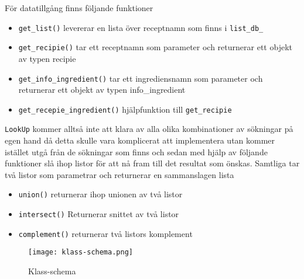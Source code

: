 För datatillgång finns följande funktioner

\begin{itemize}
\item   \verb+get_list()+ levererar en lista över receptnamn som finns i \verb+list_db_+

\item   \verb+get_recipie()+ tar ett receptnamn som parameter och returnerar ett 
        objekt av typen recipie

\item   \verb+get_info_ingredient()+ tar ett ingrediensnamn som parameter och returnerar 
        ett objekt av typen info\_ingredient

\item   \verb+get_recepie_ingredient()+ hjälpfunktion till \verb+get_recipie+
\end{itemize}

\verb+LookUp+ kommer alltså inte att klara av alla olika kombinationer av
sökningar på egen hand då detta skulle vara komplicerat att implementera utan
kommer istället utgå från de sökningar som finns och sedan med hjälp
av följande funktioner slå ihop listor för att nå fram till det
resultat som önskas. Samtliga tar två listor som parametrar och
returnerar en sammanslagen lista

\begin{itemize}
\item   \verb+union()+ returnerar ihop unionen av två listor
\item   \verb+intersect()+ Returnerar snittet av två listor
\item   \verb+complement()+ returnerar två listors komplement
\end{itemize}

\begin{figure}[h]
\centering
\texttt{[image: klass-schema.png]}
\label{fig:classes}
\caption{Klass-schema}
\end{figure}

